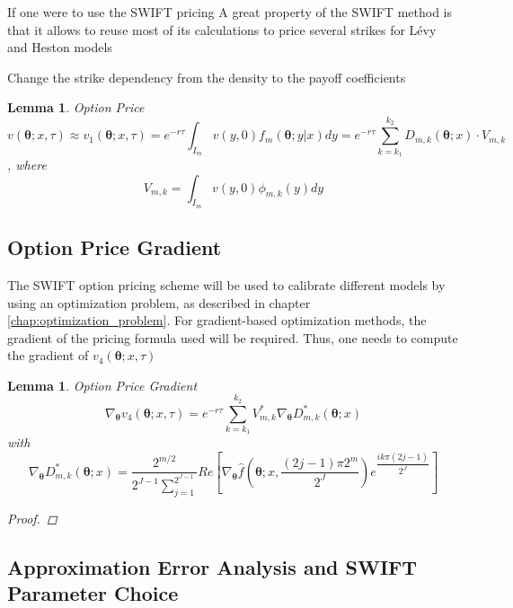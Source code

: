 \documentclass[12,twoside]{mammeTFM}
\newtheorem{lem}[thm]{Lemma}
\theoremstyle{definition}
\theoremstyle{remark}
\begin{document}
If one were to use the SWIFT pricing 
A great property of the SWIFT method is that it allows to reuse most of its calculations to price several strikes for L\'evy and Heston models

Change the strike dependency from the density to the payoff coefficients

\begin{lem} Option Price
\begin{equation}
v(\boldsymbol{\theta}; x, \tau) \approx v_1(\boldsymbol{\theta}; x, \tau) = e^{-r \tau} \int_{I_m} v(y, 0) f_m(\boldsymbol{\theta}; y|x) dy = e^{-r \tau} \sum_{k = k_1}^{k_2} D_{m,k}(\boldsymbol{\theta}; x) \cdot V_{m, k}
\end{equation}
, where $$V_{m, k} = \int_{I_m} v(y, 0) \phi_{m,k}(y)dy$$
\end{lem}

\subsection{Option Price Gradient}

The SWIFT option pricing scheme will be used to calibrate different models by using an optimization problem, as described in chapter \ref{chap:optimization_problem}. For gradient-based optimization methods, the gradient of the pricing formula used will be required. Thus, one needs to compute the gradient of $v_4(\boldsymbol{\theta}; x, \tau)$

\begin{lem} Option Price Gradient
\begin{equation}
\nabla_{\boldsymbol{\theta}} v_4(\boldsymbol{\theta}; x, \tau) = e^{-r \tau} \sum_{k = k_1}^{k_2} V_{m, k}^{*} \nabla_{\boldsymbol{\theta}} D_{m,k}^{*}(\boldsymbol{\theta}; x)
\end{equation}
with
\begin{equation}
\nabla_{\boldsymbol{\theta}} D_{m,k}^{*} (\boldsymbol{\theta}; x) = \dfrac{2^{m/2}}{2^{J-1} \sum_{j=1}^{2^{J-1}}} Re \left[ 
\nabla_{\boldsymbol{\theta}} \hat{f}\left(\boldsymbol{\theta}; x, \dfrac{(2j - 1) \pi 2^m}{2^J}\right) e^{\dfrac{ik\pi(2j-1)}{2^J}}\right] 
\end{equation}
\begin{proof}

\end{proof}
\end{lem}

\subsection{Approximation Error Analysis and SWIFT Parameter Choice} \label{subsec:approximation_error}
\end{document}
